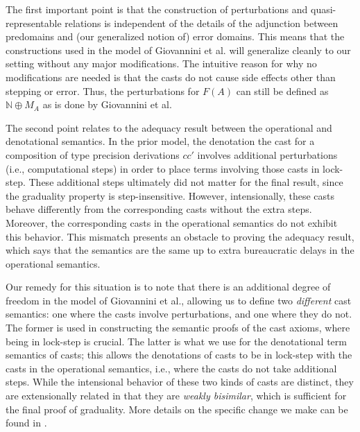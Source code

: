 \documentclass[acmsmall,screen,review,anonymous]{acmart}
\theoremstyle{remark}
\begin{document}
The first important point is that the construction of perturbations and
quasi-representable relations is independent of the details of the adjunction
between predomains and (our generalized notion of) error domains. This means
that the constructions used in the model of Giovannini et al. will generalize
cleanly to our setting without any major modifications. The intuitive reason for
why no modifications are needed is that the casts do not cause side effects
other than stepping or error. Thus, the perturbations for $F(A)$ can still be
defined as $\mathbb{N} \oplus M_A$ as is done by Giovannini et al.

The second point relates to the adequacy result between the operational and
denotational semantics. In the prior model, the denotation the cast for a
composition of type precision derivations $cc'$ involves additional
perturbations (i.e., computational steps) in order to place terms involving
those casts in lock-step. These additional steps ultimately did not matter for
the final result, since the graduality property is step-insensitive. However,
intensionally, these casts behave differently from the corresponding casts
without the extra steps. Moreover, the corresponding casts in the operational
semantics do not exhibit this behavior. This mismatch presents an obstacle to
proving the adequacy result, which says that the semantics are the same up to
extra bureaucratic delays in the operational semantics.

Our remedy for this situation is to note that there is an additional degree of
freedom in the model of Giovannini et al., allowing us to define two
\emph{different} cast semantics: one where the casts involve perturbations, and
one where they do not. The former is used in constructing the semantic proofs of
the cast axioms, where being in lock-step is crucial. The latter is what we use
for the denotational term semantics of casts; this allows the denotations of casts
to be in lock-step with the casts in the operational semantics, i.e., where the
casts do not take additional steps. While the intensional behavior of these two
kinds of casts are distinct, they are extensionally related in that they are
\emph{weakly bisimilar}, which is sufficient for the final proof of graduality.
More details on the specific change we make can be found in \citeappendix.
\end{document}
